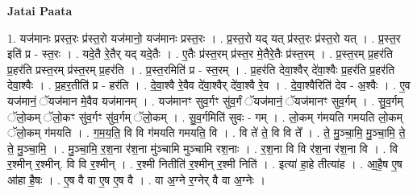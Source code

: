 \documentclass[17pt]{extarticle}
\begin{document}
\textbf{Jatai Paata} \newline

1. यज॑मानः प्रस्त॒रः प्र॑स्त॒रो यज॑मानो॒ यज॑मानः प्रस्त॒रः । . प्र॒स्त॒रो यद् यत् प्र॑स्त॒रः प्र॑स्त॒रो यत् । . प्र॒स्त॒र इति॑ प्र - स्त॒रः । . यदे॒तै रे॒तैर् यद् यदे॒तैः । . ए॒तैः प्र॑स्त॒रम् प्र॑स्त॒र मे॒तैरे॒तैः प्र॑स्त॒रम् । . प्र॒स्त॒रम् प्र॒हर॑ति प्र॒हर॑ति प्रस्त॒रम् प्र॑स्त॒रम् प्र॒हर॑ति । . प्र॒स्त॒रमिति॑ प्र - स्त॒रम् । . प्र॒हर॑ति देवा॒श्वैर् दे॑वा॒श्वैः प्र॒हर॑ति प्र॒हर॑ति देवा॒श्वैः । . प्र॒हर॒तीति॑ प्र - हर॑ति । . दे॒वा॒श्वै रे॒वैव दे॑वा॒श्वैर् दे॑वा॒श्वै रे॒व । . दे॒वा॒श्वैरिति॑ देव - अ॒श्वैः । . ए॒व यज॑मानं॒ ॅयज॑मान मे॒वैव यज॑मानम् । . यज॑मानꣳ सुव॒र्गꣳ सु॑व॒र्गं ॅयज॑मानं॒ ॅयज॑मानꣳ सुव॒र्गम् । . सु॒व॒र्गम् ॅलो॒कम् ॅलो॒कꣳ सु॑व॒र्गꣳ सु॑व॒र्गम् ॅलो॒कम् । . सु॒व॒र्गमिति॑ सुवः - गम् । . लो॒कम् ग॑मयति गमयति लो॒कम् ॅलो॒कम् ग॑मयति । . ग॒म॒य॒ति॒ वि वि ग॑मयति गमयति॒ वि । . वि ते॑ ते॒ वि वि ते᳚ । . ते॒ मु॒ञ्चा॒मि॒ मु॒ञ्चा॒मि॒ ते॒ ते॒ मु॒ञ्चा॒मि॒ । . मु॒ञ्चा॒मि॒ र॒श॒ना र॑श॒ना मु॑ञ्चामि मुञ्चामि रश॒नाः । . र॒श॒ना वि वि र॑श॒ना र॑श॒ना वि । . वि र॒श्मीन् र॒श्मीन्. वि वि र॒श्मीन् । . र॒श्मी नितीति॑ र॒श्मीन् र॒श्मी निति॑ । . इत्या॑ हा॒हे तीत्या॑ह । . आ॒है॒ष ए॒ष आ॑हा है॒षः । . ए॒ष वै वा ए॒ष ए॒ष वै । . वा अ॒ग्ने र॒ग्नेर् वै वा अ॒ग्नेः । \newline
\end{document}
